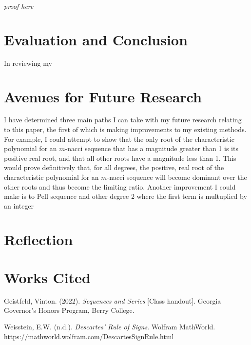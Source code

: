 \documentclass[11pt]{article}
\begin{document}
\emph{proof here}


\section{Evaluation and Conclusion}
In reviewing my 

\section{Avenues for Future Research}
    I have determined three main paths I can take with my future research relating to this paper, the first of which is making improvements to my existing methods. For example, I could attempt to show that the only root of the characteristic polynomial for an \(m\)-nacci sequence that has a magnitude greater than 1 is its positive real root, and that all other roots have a magnitude less than 1. This would prove definitively that, for all degrees, the positive, real root of the characteristic polynomial for an \(m\)-nacci sequence will become dominant over the other roots and thus become the limiting ratio. Another improvement I could make is to 
Pell sequence and other degree 2 where the first term is multuplied by an integer 

\section{Reflection}


\newpage 

\section{Works Cited}

\begin{hangparas}{.25in}{1}
    Geistfeld, Vinton. (2022). \emph{Sequences and Series} [Class handout]. Georgia Governor's Honors Program, Berry College.
    
    Weisstein, E.W. (n.d.). \emph{Descartes' Rule of Signs}. Wolfram MathWorld. https://mathworld.wolfram.com/DescartesSignRule.html
\end{hangparas}
\end{document}
